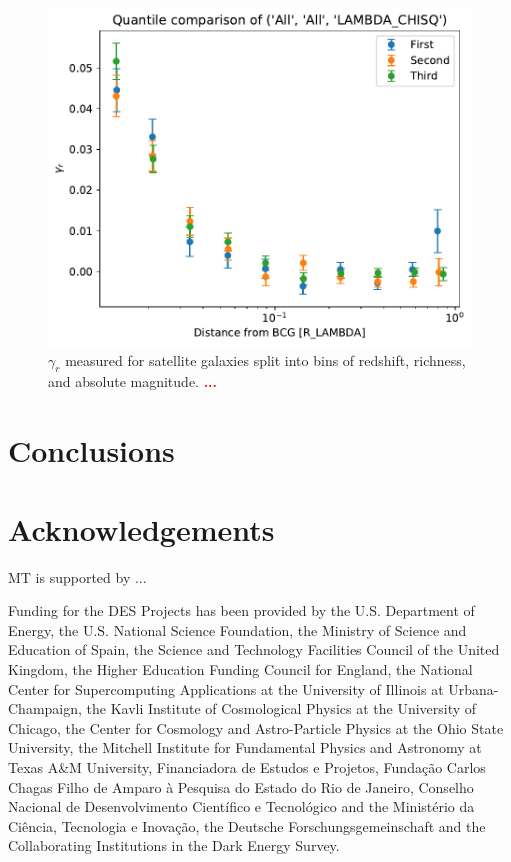 \documentclass[fleqn,usenatbib]{mnras}
\newcommand{\verify}[1]{\textcolor{red}{\textbf{{#1}}}}
\begin{document}
\begin{figure}
\begin{center}
\includegraphics[width=\columnwidth]{zhou_lambda_tertile.pdf}
\end{center}
\caption[]{$\gamma_r$ measured for satellite galaxies split into bins of redshift, richness, and absolute magnitude. \verify{...}
\label{fig:gammar2}}
\end{figure}

\section{Conclusions}



\section*{Acknowledgements}

MT is supported by ... 

Funding for the DES Projects has been provided by the U.S. Department of Energy, the U.S. National Science Foundation, the Ministry of Science and Education of Spain, 
the Science and Technology Facilities Council of the United Kingdom, the Higher Education Funding Council for England, the National Center for Supercomputing 
Applications at the University of Illinois at Urbana-Champaign, the Kavli Institute of Cosmological Physics at the University of Chicago, 
the Center for Cosmology and Astro-Particle Physics at the Ohio State University,
the Mitchell Institute for Fundamental Physics and Astronomy at Texas A\&M University, Financiadora de Estudos e Projetos, 
Funda{\c c}{\~a}o Carlos Chagas Filho de Amparo {\`a} Pesquisa do Estado do Rio de Janeiro, Conselho Nacional de Desenvolvimento Cient{\'i}fico e Tecnol{\'o}gico and 
the Minist{\'e}rio da Ci{\^e}ncia, Tecnologia e Inova{\c c}{\~a}o, the Deutsche Forschungsgemeinschaft and the Collaborating Institutions in the Dark Energy Survey. 
\end{document}
